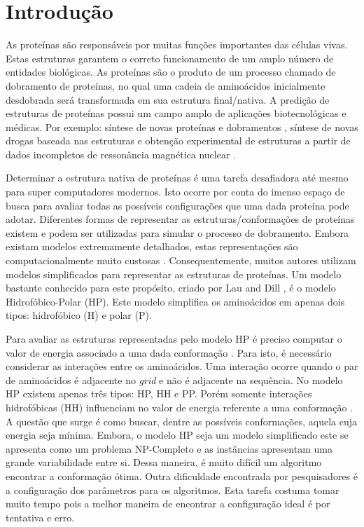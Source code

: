 \chapter{Introdução}

As proteínas são responsáveis por muitas funções importantes das células vivas. Estas estruturas garantem o correto funcionamento de um amplo número de entidades biológicas. As proteínas são o produto de um processo chamado de dobramento de proteínas, no qual uma cadeia de aminoácidos inicialmente desdobrada será transformada em sua estrutura final/nativa. A predição de estruturas de proteínas possui um campo amplo de aplicações biotecnológicas e médicas. Por exemplo: síntese de novas proteínas e dobramentos \cite{wang2012structural, rothlisberger2008kemp}, síntese de novas drogas baseada nas estruturas \cite{qian2004improvement, krieger2009improving}  e obtenção experimental de estruturas a partir de dados incompletos de ressonância magnética nuclear \cite{shen2009novo}.  

Determinar a estrutura nativa de proteínas é uma tarefa desafiadora até mesmo para super computadores modernos. Isto ocorre por conta do imenso espaço de busca para avaliar todas as possíveis configurações que uma dada proteína pode adotar. Diferentes formas de representar as estruturas/conformações de proteínas existem e podem ser utilizadas para simular o processo de dobramento. Embora existam modelos extremamente detalhados, estas representações são computacionalmente muito custosas \cite{benitez2015algoritmo, santana2008protein}. Consequentemente, muitos autores \cite{custodio2004investigation,hsu2003growth,lin2011protein,unger1993genetic,santana2008protein,custodio2014multiple, garza2012locality} utilizam modelos simplificados para representar as estruturas de proteínas. Um modelo bastante conhecido para este propósito, criado por Lau and Dill \cite{lau1989lattice}, é o modelo Hidrofóbico-Polar (HP). Este modelo simplifica os aminoácidos em apenas dois tipos: hidrofóbico (H) e polar (P). 

Para avaliar as estruturas representadas pelo modelo HP é preciso computar o valor de energia associado a uma dada conformação \cite{unger1993genetic}. Para isto, é necessário considerar as interações entre os aminoácidos. Uma interação ocorre quando o par de aminoácidos é adjacente no \textit{grid} e não é adjacente na sequência. No modelo HP existem apenas três tipos: HP, HH e PP. Porém somente interações hidrofóbicas (HH) influenciam no valor de energia referente a uma conformação \cite{unger1993genetic}. A questão que surge é como buscar, dentre as possíveis conformações, aquela cuja energia seja mínima. Embora, o modelo HP seja um modelo simplificado este se apresenta como um problema NP-Completo e as instâncias apresentam uma grande variabilidade entre si. Dessa maneira, é muito difícil um algoritmo encontrar a conformação ótima. Outra dificuldade encontrada por pesquisadores é a configuração dos parâmetros para os algoritmos. Esta tarefa costuma tomar muito tempo pois a melhor maneira de encontrar a configuração ideal é por tentativa e erro.

